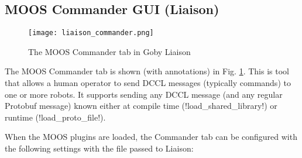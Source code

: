 \subsection{MOOS Commander GUI (Liaison)}

\begin{figure}
\centering
\texttt{[image: liaison\_commander.png]}
\caption{The MOOS Commander tab in Goby Liaison}
\label{fig:liaison_commander}
\end{figure}


The MOOS Commander tab is shown (with annotations) in Fig. \ref{fig:liaison_commander}. This is tool that allows a human operator to send DCCL messages (typically commands) to one or more robots. It supports sending any DCCL message (and any regular Protobuf message) known either at compile time  (!load_shared_library!) or runtime (!load_proto_file!).


When the MOOS plugins are loaded, the Commander tab can be configured with the following settings with the file passed to Liaison:

\resetbvlinenumber


